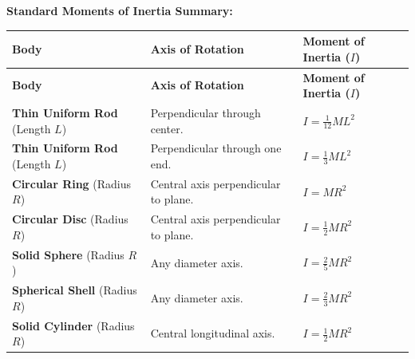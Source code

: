 \documentclass[12pt,a4paper]{article}
\begin{document}
\textbf{Standard Moments of Inertia Summary:}\par\vspace{6pt}\noindent
\begingroup
\setlength{\LTleft}{0pt}
\setlength{\LTright}{0pt}
\begin{longtable}{|B{3.2cm}|>{\small\raggedright\arraybackslash}m{\dimexpr(\linewidth-3.2cm-6\arrayrulewidth)/2\relax}|>{\small\raggedright\arraybackslash}m{\dimexpr(\linewidth-3.2cm-6\arrayrulewidth)/2\relax}|}
\hline
\textbf{Body} & \textbf{Axis of Rotation} & \textbf{Moment of Inertia ($I$)} \\
\hline
\endfirsthead
\hline
\textbf{Body} & \textbf{Axis of Rotation} & \textbf{Moment of Inertia ($I$)} \\
\hline
\endhead
\textbf{Thin Uniform Rod} (Length $L$) & Perpendicular through center. & $I = \frac{1}{12} M L^2$ \\
\hline
\textbf{Thin Uniform Rod} (Length $L$) & Perpendicular through one end. & $I = \frac{1}{3} M L^2$ \\
\hline
\textbf{Circular Ring} (Radius $R$) & Central axis perpendicular to plane. & $I = M R^2$ \\
\hline
\textbf{Circular Disc} (Radius $R$) & Central axis perpendicular to plane. & $I = \frac{1}{2} M R^2$ \\
\hline
\textbf{Solid Sphere} (Radius $R$) & Any diameter axis. & $I = \frac{2}{5} M R^2$ \\
\hline
\textbf{Spherical Shell} (Radius $R$) & Any diameter axis. & $I = \frac{2}{3} M R^2$ \\
\hline
\textbf{Solid Cylinder} (Radius $R$) & Central longitudinal axis. & $I = \frac{1}{2} M R^2$ \\
\hline
\end{longtable}
\endgroup
\end{document}
